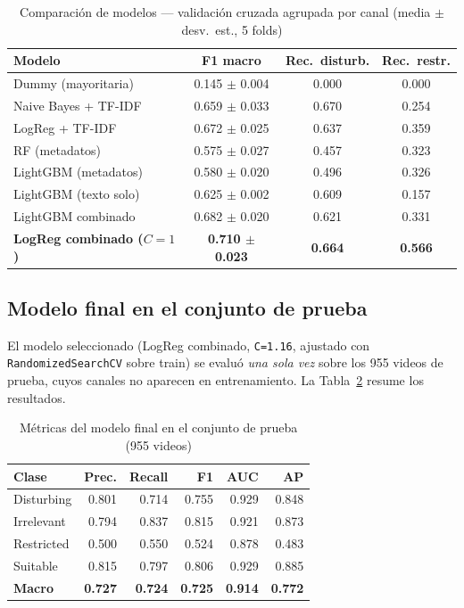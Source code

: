\documentclass[conference]{IEEEtran}
\begin{document}
\begin{table}[!t]
\caption{Comparación de modelos — validación cruzada agrupada por canal (media $\pm$ desv.\ est., 5 folds)}
\begin{center}
\footnotesize
\setlength{\tabcolsep}{3pt}
\begin{tabular}{|l|c|c|c|}
\hline
\textbf{Modelo} & \textbf{F1 macro} & \textbf{Rec.\ disturb.} & \textbf{Rec.\ restr.} \\
\hline
Dummy (mayoritaria) & 0.145 $\pm$ 0.004 & 0.000 & 0.000 \\
\hline
Naive Bayes + TF-IDF & 0.659 $\pm$ 0.033 & 0.670 & 0.254 \\
\hline
LogReg + TF-IDF & 0.672 $\pm$ 0.025 & 0.637 & 0.359 \\
\hline
RF (metadatos) & 0.575 $\pm$ 0.027 & 0.457 & 0.323 \\
\hline
LightGBM (metadatos) & 0.580 $\pm$ 0.020 & 0.496 & 0.326 \\
\hline
LightGBM (texto solo) & 0.625 $\pm$ 0.002 & 0.609 & 0.157 \\
\hline
LightGBM combinado & 0.682 $\pm$ 0.020 & 0.621 & 0.331 \\
\hline
\textbf{LogReg combinado ($C{=}1$)} & \textbf{0.710 $\pm$ 0.023} & \textbf{0.664} & \textbf{0.566} \\
\hline
\end{tabular}
\label{tab:modelos}
\end{center}
\end{table}

\subsection{Modelo final en el conjunto de prueba}\label{sec:final}
El modelo seleccionado (LogReg combinado, \texttt{C=1.16}, ajustado con \texttt{RandomizedSearchCV} sobre train) se evaluó \emph{una sola vez} sobre los 955 videos de prueba, cuyos canales no aparecen en entrenamiento. La Tabla~\ref{tab:final} resume los resultados.

\begin{table}[!t]
\caption{Métricas del modelo final en el conjunto de prueba (955 videos)}
\begin{center}
\footnotesize
\setlength{\tabcolsep}{3pt}
\begin{tabular}{|l|r|r|r|r|r|}
\hline
\textbf{Clase} & \textbf{Prec.} & \textbf{Recall} & \textbf{F1} & \textbf{AUC} & \textbf{AP} \\
\hline
Disturbing & 0.801 & 0.714 & 0.755 & 0.929 & 0.848 \\
\hline
Irrelevant & 0.794 & 0.837 & 0.815 & 0.921 & 0.873 \\
\hline
Restricted & 0.500 & 0.550 & 0.524 & 0.878 & 0.483 \\
\hline
Suitable & 0.815 & 0.797 & 0.806 & 0.929 & 0.885 \\
\hline
\textbf{Macro} & \textbf{0.727} & \textbf{0.724} & \textbf{0.725} & \textbf{0.914} & \textbf{0.772} \\
\hline
\end{tabular}
\label{tab:final}
\end{center}
\end{table}
\end{document}
